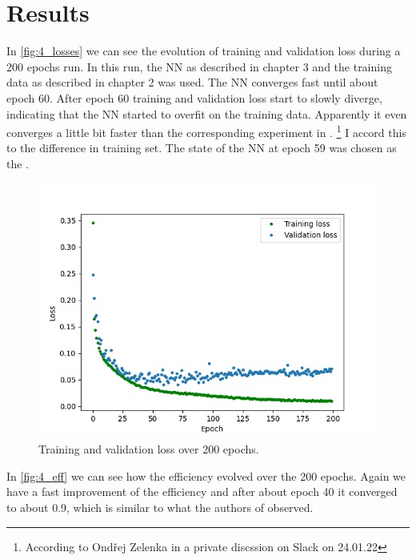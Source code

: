 
\section{Results}
In \autoref{fig:4_losses} we can see the evolution of training and validation
loss during a 200 epochs run. In this run, the NN as described in chapter 3 and
the training data as described in chapter 2 was used. The NN converges fast
until about epoch 60. After epoch 60 training and validation loss start to
slowly diverge, indicating that the NN started to overfit on the training data.
Apparently it even converges a little bit faster than the corresponding 
experiment in \cite{PhysRevD.105.043002}.
\footnote{According to Ondřej Zelenka in a private discssion on Slack on
  24.01.22} I accord this to the difference in training set. The state of the
NN at epoch 59 was chosen as the .

\begin{figure}[ht]
  \includegraphics[width=\textwidth]{img/4_results/losses.png}
  \caption{Training and validation loss over 200 epochs.}
  \label{fig:4_losses}
  \centering
\end{figure}

In \autoref{fig:4_eff} we can see how the efficiency evolved over the 200 epochs.
Again we have a fast improvement of the efficiency and after about epoch 40 it
converged to about 0.9, which is similar to what the authors of
\cite{PhysRevD.105.043002} observed.

